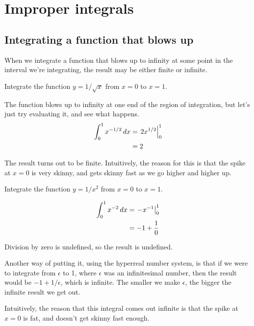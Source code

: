 \chapter{Improper integrals}

\section{Integrating a function that blows up}
When we integrate a function that blows up to infinity at some
point in the interval we're integrating, the result may be either
finite or infinite.

\begin{eg}\label{eg:improper-a}
\egquestion Integrate the function $y=1/\sqrt{x}$ from $x=0$ to $x=1$.

\eganswer The function blows up to infinity at one end of the region
of integration, but let's just try evaluating it, and see what happens.
\begin{align*}
  \int_0^1 x^{-1/2}\mathop{d\!} x &= \left.2x^{1/2}\right|_0^1 \\
                         &= 2
\end{align*}

The result turns out to be finite. Intuitively, the reason for this
is that the spike at $x=0$ is very skinny, and gets skinny fast
as we go higher and higher up.
\end{eg}


\pagebreak

\begin{eg}
\egquestion Integrate the function $y=1/x^2$ from $x=0$ to $x=1$.

\eganswer 
\begin{align*}
  \int_0^1 x^{-2}\mathop{d\!} x &= \left.-x^{-1}\right|_0^1 \\
                         &= -1+\frac{1}{0}
\end{align*}

Division by zero is undefined, so the result is undefined.

Another way of putting it, using the hyperreal number system,
is that if we were to integrate
from $\epsilon$ to 1, where $\epsilon$ was an infinitesimal
number, then the result would be $-1+1/\epsilon$, which is
infinite. The smaller we make $\epsilon$, the bigger the
infinite result we get out.

Intuitively, the reason that this integral comes out infinite is
that the spike at $x=0$ is fat, and doesn't get skinny fast enough.
\end{eg}

